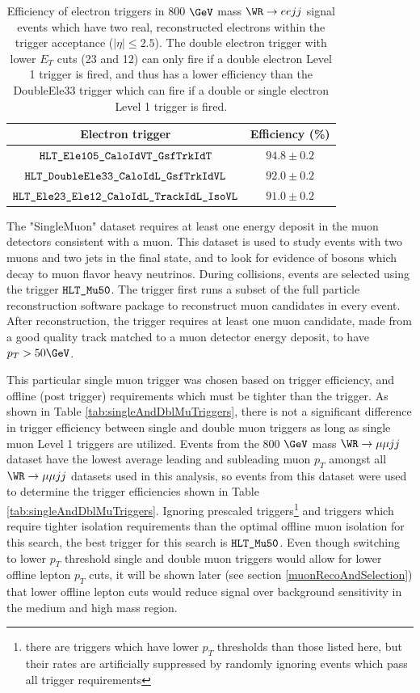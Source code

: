 \begin{table}[h]
\caption{Efficiency of electron triggers in 800 $\GeV$ \WR mass $\WR \rightarrow eejj$ signal events which have
two real, reconstructed electrons within the trigger acceptance ($|\eta| \leq 2.5$).  The double electron trigger
with lower $E_{T}$ cuts (23 and 12) can only fire if a double electron Level 1 trigger is fired, and thus has
a lower efficiency than the DoubleEle33 trigger which can fire if a double or single electron Level 1 trigger
is fired.}
\label{tab:singleAndDblEleTriggers}
\centering
\begin{tabular}{c|c|}
	Electron trigger & Efficiency (\%)  \\  \hline
	$\verb|HLT_Ele105_CaloIdVT_GsfTrkIdT|$  &  $94.8\pm0.2$  \\
	$\verb|HLT_DoubleEle33_CaloIdL_GsfTrkIdVL|$  &  $92.0\pm0.2$  \\
	$\verb|HLT_Ele23_Ele12_CaloIdL_TrackIdL_IsoVL|$  &  $91.0\pm0.2$  \\
\end{tabular}
\end{table}


The "SingleMuon" dataset requires at least one energy deposit in the muon detectors 
consistent with a muon.  This dataset is used to study events with two muons and two jets
in the final state, and to look for evidence of \WR bosons which decay to muon flavor
heavy neutrinos.  During collisions, events are selected using the trigger $\verb|HLT_Mu50|$.
The trigger first runs a subset of the full particle reconstruction software package to
reconstruct muon candidates in every event.  After reconstruction, the trigger requires at
least one muon candidate, made from a good quality track matched to a muon detector energy
deposit, to have $p_{T} > 50 \GeV$.

This particular single muon trigger was chosen based on trigger efficiency, and offline (post trigger)
requirements which must be tighter than the trigger.  As shown in
Table \ref{tab:singleAndDblMuTriggers}, there is not a significant difference in trigger efficiency
between single and double muon triggers as long as single muon Level 1 triggers are utilized.
Events from the 800 $\GeV$ \WR mass $\WR \rightarrow \mu\mu jj$ dataset have the lowest average
leading and subleading muon $p_{T}$ amongst all $\WR \rightarrow \mu\mu jj$ datasets used in this
analysis, so events from this dataset were used to determine the trigger efficiencies shown in
Table \ref{tab:singleAndDblMuTriggers}.  Ignoring prescaled triggers\footnote{there are triggers
which have lower $p_{T}$ thresholds than those listed here, but their rates are artificially
suppressed by randomly ignoring events which pass all trigger requirements} and triggers
which require tighter isolation requirements than the optimal offline muon isolation for this
search, the best trigger for this search is $\verb|HLT_Mu50|$.  Even though switching to lower $p_{T}$
threshold single and double muon triggers would allow for lower offline lepton $p_{T}$ cuts, it
will be shown later (see section \ref{muonRecoAndSelection}) that lower offline lepton cuts would reduce signal over background
sensitivity in the medium and high \WR mass region.


